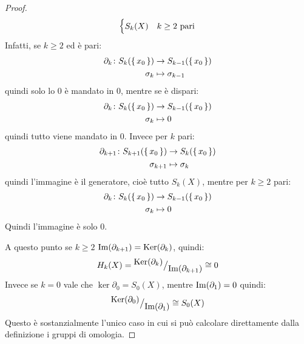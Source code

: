 \begin{proof}
\[\begin{cases}
      S_k(X)  & \text{$ k \geq 2$ pari}
    \end{cases}
  \]
  Infatti, se $ k \geq 2 $ ed è pari:
  \begin{align*}
    \partial_k \colon S_k(\set{x_0}) & \to S_{k-1}(\set{x_0}) \\
    \sigma_k & \mapsto \sigma_{k-1}
  \end{align*}
  quindi solo lo $ 0 $ è mandato in $ 0 $, mentre se è dispari:
  \begin{align*}
    \partial_k \colon S_k(\set{x_0}) & \to S_{k-1}(\set{x_0}) \\
    \sigma_k & \mapsto 0
  \end{align*}
  quindi tutto viene mandato in $ 0 $.
  Invece per $ k $ pari:
  \begin{align*}
    \partial_{k+1} \colon S_{k+1}(\set{x_0}) & \to S_{k}(\set{x_0}) \\
    \sigma_{k+1} & \mapsto \sigma_{k}
  \end{align*}
  quindi l'immagine è il generatore, cioè tutto $ S_{k}(X) $, mentre per $ k \geq 2$ pari:
  \begin{align*}
    \partial_k \colon S_k(\set{x_0}) & \to S_{k-1}(\set{x_0}) \\
    \sigma_k & \mapsto 0
  \end{align*}
  Quindi l'immagine è solo $ 0 $.

  A questo punto se $ k \geq 2 $ $ \mathrm{Im}( \partial_{k+1} ) = \mathrm{Ker}( \partial_k) $, quindi:
  \[
    H_k(X) = {^{\textstyle \mathrm{Ker}( \partial_{k})}\big/_{\textstyle \mathrm{Im}( \partial_{k+1} )}} \cong 0
  \]
  Invece se $ k = 0 $ vale che $ \ker{\partial_0} = S_0(X) $, mentre
  $ \mathrm{Im}( \partial_1 ) = 0 $ quindi:
  \[
    {^{\textstyle \mathrm{Ker}( \partial_{0})}\big/_{\textstyle \mathrm{Im}( \partial_{1} )}} \cong S_0(X)
  \]
  Questo è sostanzialmente l'unico caso in cui si può calcolare
  direttamente dalla definizione i gruppi di omologia.
\end{proof}

